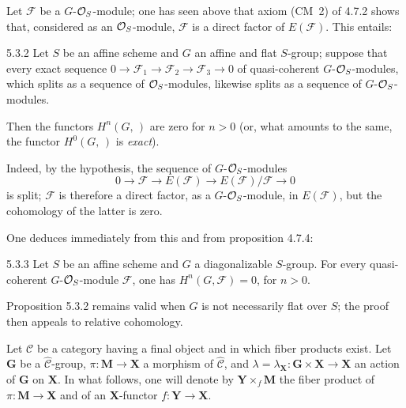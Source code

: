 Let \(\mathcal{F}\) be a \(G\)-\(\mathcal{O}_S\)-module; one has seen above that axiom (CM~2)
of 4.7.2 shows that, considered as an \(\mathcal{O}_S\)-module, \(\mathcal{F}\) is a
direct factor of \(E(\mathcal{F})\). This entails:

\begin{proposition}{5.3.2}
\label{I.5.3.2}
Let \(S\) be an affine scheme and \(G\) an affine and flat \(S\)-group; suppose
that every exact sequence \(0\to\mathcal{F}_{1}\to\mathcal{F}_{2}\to\mathcal{F}_{3}\to 0\)
of quasi-coherent \(G\)-\(\mathcal{O}_S\)-modules, which splits as a sequence of
\(\mathcal{O}_S\)-modules, likewise splits as a sequence of \(G\)-\(\mathcal{O}_S\)-modules.

Then the functors \(H^{n}(G,\,)\) are zero for \(n>0\) (or, what amounts to the
same, the functor \(H^{0}(G,\,)\) is \emph{exact}).
\end{proposition}

Indeed, by the hypothesis, the sequence of \(G\)-\(\mathcal{O}_S\)-modules
\[
0\longrightarrow\mathcal{F}\longrightarrow E(\mathcal{F})\longrightarrow E(\mathcal{F})/\mathcal{F}\longrightarrow 0
\]
is split; \(\mathcal{F}\) is therefore a direct factor, as a
\(G\)-\(\mathcal{O}_S\)-module, in \(E(\mathcal{F})\), but the cohomology of the latter is
zero.

One deduces immediately from this and from proposition 4.7.4:

\begin{theorem}{5.3.3}
\label{I.5.3.3}
Let \(S\) be an affine scheme and \(G\) a diagonalizable \(S\)-group. For every
quasi-coherent \(G\)-\(\mathcal{O}_S\)-module \(\mathcal{F}\), one has
\(H^{n}(G,\mathcal{F})=0\), for \(n>0\).
\end{theorem}

\begin{remark*}
Proposition 5.3.2 remains valid when \(G\) is not necessarily flat over \(S\);
the proof then appeals to relative cohomology.
\end{remark*}

\label{I.sec.6}
Let \(\mathcal{C}\) be a category having a final object and in which fiber
products exist. Let \(\mathbf{G}\) be a \(\widehat{\mathcal{C}}\)-group,
\(\pi\colon\mathbf{M}\to\mathbf{X}\) a morphism of \(\widehat{\mathcal{C}}\),
and \(\lambda=\lambda_{\mathbf{X}}\colon\mathbf{G}\times\mathbf{X}\to\mathbf{X}\)
an action of \(\mathbf{G}\) on \(\mathbf{X}\). In what follows, one will denote
by \(\mathbf{Y}\times_{f}\mathbf{M}\) the fiber product of
\(\pi\colon\mathbf{M}\to\mathbf{X}\) and of an \(\mathbf{X}\)-functor
\(f\colon\mathbf{Y}\to\mathbf{X}\).


